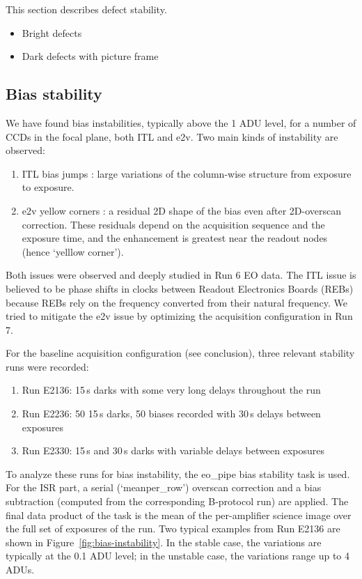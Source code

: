 This section describes defect stability.

\begin{itemize}
\tightlist
\item
  Bright defects
\item
  Dark defects with picture frame
\end{itemize}

\subsection{Bias stability}\label{sec:bias-stability-2}

We have found bias instabilities, typically above the 1 ADU level, for a number of CCDs in the focal plane, both ITL and e2v. Two main kinds of instability are observed:

\begin{enumerate}
\tightlist
\item
  ITL bias jumps : large variations of the column-wise structure from
  exposure to exposure.
\item
  e2v yellow corners : a residual 2D shape of the bias even after
  2D-overscan correction. These residuals depend on the acquisition
  sequence and the exposure time, and the enhancement is greatest near the readout nodes (hence `yelllow corner').
\end{enumerate}

Both issues were observed and deeply studied in Run 6 EO data. The ITL
issue is believed to be phase shifts in clocks between Readout
Electronics Boards (REBs) because REBs rely on the frequency converted
from their natural frequency. We tried to mitigate the e2v issue by
optimizing the acquisition configuration in Run 7.

For the baseline acquisition configuration (see conclusion), three
relevant stability runs were recorded:

\begin{enumerate}
\tightlist
\item
  Run E2136: 15\,s darks with some very long delays throughout the run
\item
  Run E2236: 50 15\,s darks, 50 biases recorded with 30\,s delays between
  exposures
\item
  Run E2330: 15\,s and 30\,s darks with variable delays between exposures
\end{enumerate}

To analyze these runs for bias instability, the eo\_pipe bias
stability task is used.  For the ISR part, a serial
(`meanper\_row')
overscan correction and a bias subtraction (computed from the
corresponding B-protocol run) are applied. The final data product of the task is the
mean of the per-amplifier science image over the full set of exposures
of the run. Two typical examples from Run E2136 are shown in Figure~\ref{fig:bias-instability}. In the stable case, the variations are typically at the 0.1 ADU
level; in the unstable case, the variations range up to 4 ADUs.

